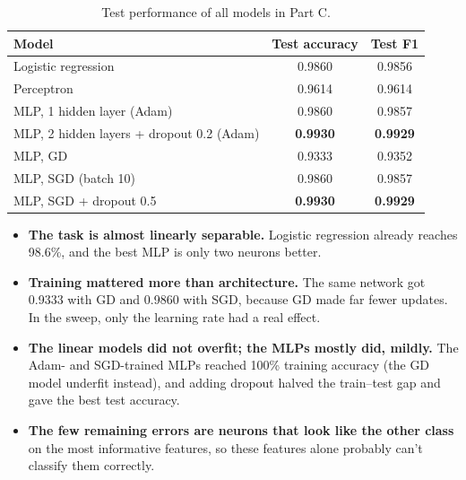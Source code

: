 \documentclass[11pt]{article}
\begin{document}
\begin{table}[H]
\centering
\caption{Test performance of all models in Part C.}
\label{tab:conclusion}
\small
\begin{tabular}{lcc}
\toprule
Model & Test accuracy & Test F1 \\
\midrule
Logistic regression                      & 0.9860 & 0.9856 \\
Perceptron                               & 0.9614 & 0.9614 \\
MLP, 1 hidden layer (Adam)               & 0.9860 & 0.9857 \\
MLP, 2 hidden layers + dropout 0.2 (Adam) & \textbf{0.9930} & \textbf{0.9929} \\
MLP, GD                                  & 0.9333 & 0.9352 \\
MLP, SGD (batch 10)                      & 0.9860 & 0.9857 \\
MLP, SGD + dropout 0.5                   & \textbf{0.9930} & \textbf{0.9929} \\
\bottomrule
\end{tabular}
\end{table}

\begin{itemize}
    \item \textbf{The task is almost linearly separable.} Logistic regression already reaches 98.6\%, and the best MLP is only two neurons better.
    \item \textbf{Training mattered more than architecture.} The same network got 0.9333 with GD and 0.9860 with SGD, because GD made far fewer updates. In the sweep, only the learning rate had a real effect.
    \item \textbf{The linear models did not overfit; the MLPs mostly did, mildly.} The Adam- and SGD-trained MLPs reached 100\% training accuracy (the GD model underfit instead), and adding dropout halved the train--test gap and gave the best test accuracy.
    \item \textbf{The few remaining errors are neurons that look like the other class} on the most informative features, so these features alone probably can't classify them correctly.
\end{itemize}
\end{document}
